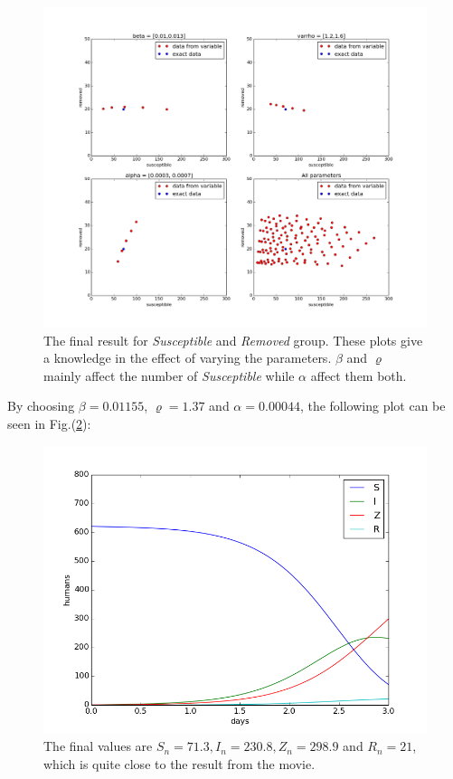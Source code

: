\documentclass[%
twoside,                 %
final,                   %
chapterprefix=true,      %
open=right               %
10pt]{book}
\begin{document}
\begin{figure}[ht]
  \centerline{\includegraphics[width=0.9\linewidth]{1_fig/check_parameters.png}}
  \caption{
  \label{fig:initial_parameters} The final result for \emph{Susceptible} and \emph{Removed} group. These plots give a knowledge in the effect of varying the parameters. $\beta$ and $\varrho$ mainly affect the number of \emph{Susceptible} while $\alpha$ affect them both.
  }
\end{figure}


By choosing $\beta = 0.01155$, $\varrho=1.37$ and $\alpha=0.00044$, the following plot can be seen in Fig.(\ref{fig:initial_phase_2}):  


\begin{figure}[ht]
  \centerline{\includegraphics[width=0.9\linewidth]{1_fig/WD_zombie_initial_2.png}}
  \caption{
  \label{fig:initial_phase_2} The final values are $S_n=71.3,I_n=230.8,Z_n=298.9$ and $R_n=21$, which is quite close to the result from the movie.
  }
\end{figure}
\end{document}
